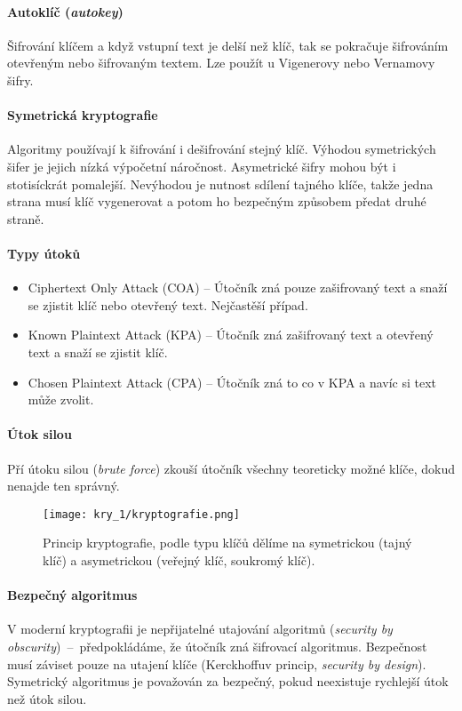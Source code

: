 \paragraph*{Autoklíč (\textit{autokey})} Šifrování klíčem a když vstupní text je delší než klíč, tak se pokračuje šifrováním otevřeným nebo šifrovaným textem. Lze použít u Vigenerovy nebo Vernamovy šifry.

\paragraph*{Symetrická kryptografie} Algoritmy používají k šifrování i dešifrování stejný klíč. Výhodou symetrických šifer je jejich nízká výpočetní náročnost. Asymetrické šifry mohou být i stotisíckrát pomalejší. Nevýhodou je nutnost sdílení tajného klíče, takže jedna strana musí klíč vygenerovat a potom ho bezpečným způsobem předat druhé straně.

\paragraph*{Typy útoků} \begin{itemize}
    \item Ciphertext Only Attack (COA) -- Útočník zná pouze zašifrovaný text a snaží se zjistit klíč nebo otevřený text. Nejčastěší případ.
    \item Known Plaintext Attack (KPA) -- Útočník zná zašifrovaný text a otevřený text a snaží se zjistit klíč.
    \item Chosen Plaintext Attack (CPA) -- Útočník zná to co v KPA a navíc si text může zvolit.
\end{itemize}

\paragraph*{Útok silou} Pří útoku silou (\textit{brute force}) zkouší útočník všechny teoreticky možné klíče, dokud nenajde ten správný.

\begin{figure}[H]
    \centering
    \texttt{[image: kry\_1/kryptografie.png]}
    \caption{Princip kryptografie, podle typu klíčů dělíme na symetrickou (tajný klíč) a asymetrickou (veřejný klíč, soukromý klíč).}
\end{figure}

\paragraph*{Bezpečný algoritmus} V moderní kryptografii je nepřijatelné utajování algoritmů (\textit{security by obscurity})~--~předpokládáme, že útočník zná šifrovací algoritmus. Bezpečnost musí záviset pouze na utajení klíče (Kerckhoffuv princip, \textit{security by design}). Symetrický algoritmus je považován za bezpečný, pokud neexistuje rychlejší útok než útok silou.

